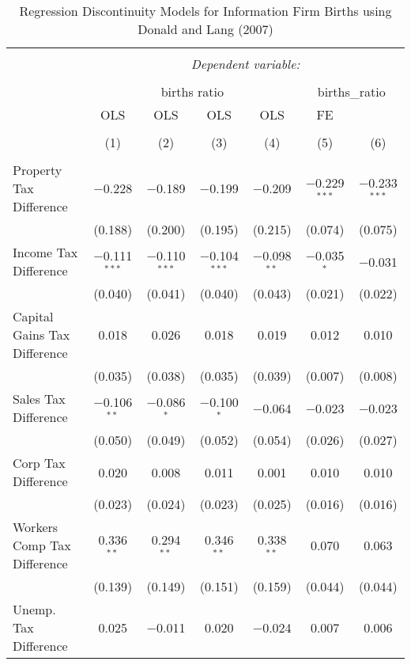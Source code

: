 
\begin{table}[!htbp] \centering 
  \caption{Regression Discontinuity Models for  Information Firm Births using Donald and Lang (2007)} 
  \label{} 
\begin{tabular}{@{\extracolsep{5pt}}lcccccc} 
\\[-1.8ex]\hline 
\hline \\[-1.8ex] 
 & \multicolumn{6}{c}{\textit{Dependent variable:}} \\ 
\cline{2-7} 
\\[-1.8ex] & \multicolumn{4}{c}{births ratio} & \multicolumn{2}{c}{births\_ratio} \\ 
 & OLS & OLS & OLS & OLS & FE &  \\ 
\\[-1.8ex] & (1) & (2) & (3) & (4) & (5) & (6)\\ 
\hline \\[-1.8ex] 
 Property Tax Difference & $-$0.228 & $-$0.189 & $-$0.199 & $-$0.209 & $-$0.229$^{***}$ & $-$0.233$^{***}$ \\ 
  & (0.188) & (0.200) & (0.195) & (0.215) & (0.074) & (0.075) \\ 
  Income Tax Difference & $-$0.111$^{***}$ & $-$0.110$^{***}$ & $-$0.104$^{***}$ & $-$0.098$^{**}$ & $-$0.035$^{*}$ & $-$0.031 \\ 
  & (0.040) & (0.041) & (0.040) & (0.043) & (0.021) & (0.022) \\ 
  Capital Gains Tax Difference & 0.018 & 0.026 & 0.018 & 0.019 & 0.012 & 0.010 \\ 
  & (0.035) & (0.038) & (0.035) & (0.039) & (0.007) & (0.008) \\ 
  Sales Tax Difference & $-$0.106$^{**}$ & $-$0.086$^{*}$ & $-$0.100$^{*}$ & $-$0.064 & $-$0.023 & $-$0.023 \\ 
  & (0.050) & (0.049) & (0.052) & (0.054) & (0.026) & (0.027) \\ 
  Corp Tax Difference & 0.020 & 0.008 & 0.011 & 0.001 & 0.010 & 0.010 \\ 
  & (0.023) & (0.024) & (0.023) & (0.025) & (0.016) & (0.016) \\ 
  Workers Comp Tax Difference & 0.336$^{**}$ & 0.294$^{**}$ & 0.346$^{**}$ & 0.338$^{**}$ & 0.070 & 0.063 \\ 
  & (0.139) & (0.149) & (0.151) & (0.159) & (0.044) & (0.044) \\ 
  Unemp. Tax Difference & 0.025 & $-$0.011 & 0.020 & $-$0.024 & 0.007 & 0.006 \\ 

\end{tabular}
\end{table}
